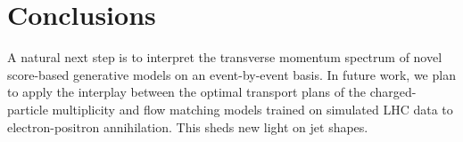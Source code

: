 \section{Conclusions}\label{sec:conclusions}

A natural next step is to interpret the transverse momentum spectrum of
novel score-based generative models on an event-by-event basis. In
future work, we plan to apply the interplay between the optimal
transport plans of the charged-particle multiplicity and flow matching
models trained on simulated LHC data to electron-positron annihilation.
This sheds new light on jet shapes.

